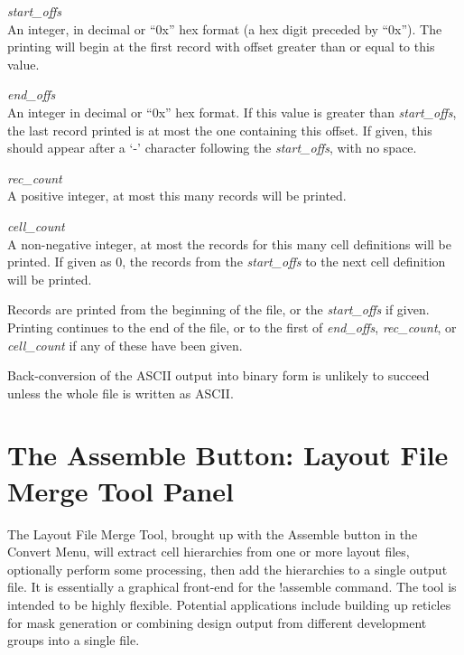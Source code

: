\begin{description}
\item{\it start\_offs}\\
An integer, in decimal or ``{\vt 0x}'' hex format (a hex digit
preceded by ``{\vt 0x}'').  The printing will begin at the first
record with offset greater than or equal to this value.

\item{\it end\_offs}\\
An integer in decimal or ``{\vt 0x}'' hex format.  If this value is
greater than {\it start\_offs}, the last record printed is at most the
one containing this offset.  If given, this should appear after a `{\vt -}'
character following the {\it start\_offs}, with no space.

\item{\it rec\_count}\\
A positive integer, at most this many records will be printed.

\item{\it cell\_count}\\
A non-negative integer, at most the records for this many cell
definitions will be printed.  If given as 0, the records from the {\it
start\_offs} to the next cell definition will be printed.
\end{description}

Records are printed from the beginning of the file, or the {\it
start\_offs} if given.  Printing continues to the end of the file, or
to the first of {\it end\_offs}, {\it rec\_count}, or {\it
cell\_count} if any of these have been given.

Back-conversion of the ASCII output into binary form is unlikely
to succeed unless the whole file is written as ASCII.


\section{The {\cb Assemble} Button: {\cb Layout File Merge Tool} Panel}
The {\cb Layout File Merge Tool}, brought up with the {\cb Assemble}
button in the {\cb Convert Menu}, will extract cell hierarchies from
one or more layout files, optionally perform some processing, then add
the hierarchies to a single output file.  It is essentially a
graphical front-end for the {\cb !assemble} command.  The tool is
intended to be highly flexible.  Potential applications include
building up reticles for mask generation or combining design output
from different development groups into a single file.


